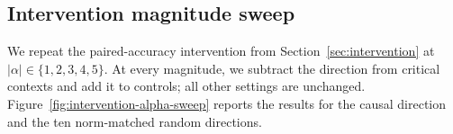 \subsection{Intervention magnitude sweep}
\label{app:fixed-alpha-sweep}
We repeat the paired-accuracy intervention from
Section~\ref{sec:intervention} at
$|\alpha|\in\{1,2,3,4,5\}$. At every magnitude, we subtract the direction
from critical contexts and add it to controls; all other settings are
unchanged. Figure~\ref{fig:intervention-alpha-sweep} reports the results for
the causal direction and the ten norm-matched random directions.
